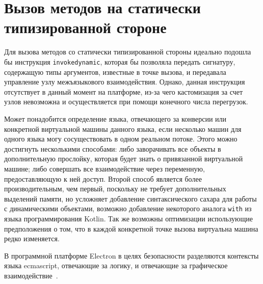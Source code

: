\documentclass[times
]{itmo-student-thesis}
\begin{document}
\section{Вызов методов на статически типизированной стороне}
Для вызова методов со статически типизированной стороны идеально подошла бы инструкция \texttt{invokedynamic}, которая бы позволяла передать сигнатуру, содержащую типы аргументов, известные в точке вызова, и передавала управление узлу межъязыкового взаимодействия. Однако, данная инструкция отсутствует в данный момент на платформе, из-за чего кастомизация за счет узлов невозможна и осуществляется при помощи конечного числа перегрузок.

Может понадобится определение языка, отвечающего за конверсии или конкретной виртуальной машины данного языка, если несколько машин для одного языка могу сосуществовать в одном реальном потоке. Этого можно достигнуть несколькими способами: либо заворачивать все объекты в дополнительную прослойку, которая будет знать о привязанной виртуальной машине; либо совершать все взаимодействие через переменную, предоставляющую к ней доступ. Второй способ является более производительным, чем первый, поскольку не требует дополнительных выделений памяти, но усложняет добавление синтаксического сахара для работы с динамическими объектами, возможно добавление некоторого аналога \texttt{with} из языка программирования Kotlin. Так же возможны оптимизации использующие предположения о том, что в каждой конкретной точке вызова виртуальна машина редко изменяется.

В программной платформе Electron в целях безопасности разделяются контексты языка ecmascript, отвечающие за логику, и отвечающие за графическое взаимодействие~\cite{electron-isolates}.
\end{document}
